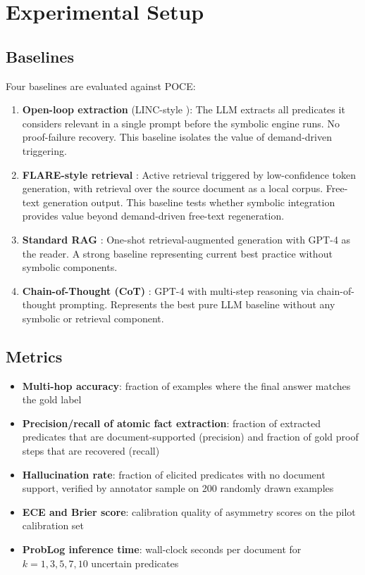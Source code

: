 \documentclass[11pt,letterpaper]{article}
\begin{document}
\section{Experimental Setup}
\label{sec:experiments}

\subsection{Baselines}

Four baselines are evaluated against POCE:

\begin{enumerate}
  \item \textbf{Open-loop extraction} (LINC-style \citep{Olausson2023}): The LLM extracts all predicates it considers relevant in a single prompt before the symbolic engine runs. No proof-failure
    recovery. This baseline isolates the value of demand-driven triggering.
  \item \textbf{FLARE-style retrieval} \citep{Jiang2023}: Active retrieval triggered by low-confidence token generation, with retrieval over the source document as a local corpus. Free-text generation
    output. This baseline tests whether symbolic integration provides value beyond demand-driven free-text regeneration.
  \item \textbf{Standard RAG} \citep{Lewis2020}: One-shot retrieval-augmented generation with GPT-4 as the reader. A strong baseline representing current best practice without symbolic components.
  \item \textbf{Chain-of-Thought (CoT)} \citep{Wei2022}: GPT-4 with multi-step reasoning via chain-of-thought prompting. Represents the best pure LLM baseline without any symbolic or retrieval component.
\end{enumerate}

\subsection{Metrics}

\begin{itemize}
  \item \textbf{Multi-hop accuracy}: fraction of examples where the final answer matches the gold label
  \item \textbf{Precision/recall of atomic fact extraction}: fraction of extracted predicates that are document-supported (precision) and fraction of gold proof steps that are recovered (recall)
  \item \textbf{Hallucination rate}: fraction of elicited predicates with no document support, verified by annotator sample on 200 randomly drawn examples
  \item \textbf{ECE and Brier score}: calibration quality of asymmetry scores on the pilot calibration set
  \item \textbf{ProbLog inference time}: wall-clock seconds per document for $k = 1, 3, 5, 7, 10$ uncertain predicates
\end{itemize}
\end{document}
